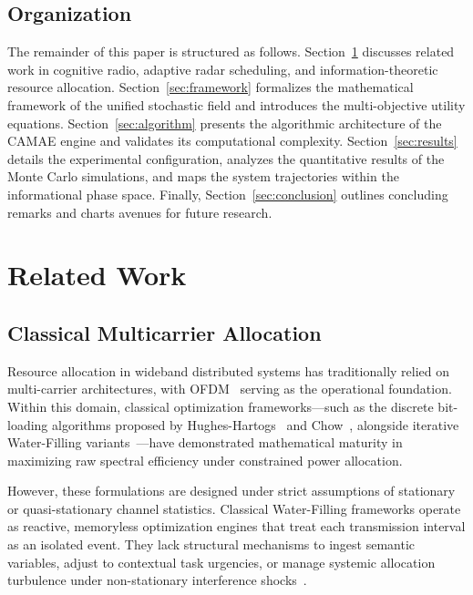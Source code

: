 \documentclass[journal,10pt,twocolumn,twoside]{IEEEtran}
\begin{document}
\subsection{Organization}

The remainder of this paper is structured as follows. Section~\ref{sec:related} discusses related work in cognitive radio, adaptive radar scheduling, and information-theoretic resource allocation. Section~\ref{sec:framework} formalizes the mathematical framework of the unified stochastic field and introduces the multi-objective utility equations. Section~\ref{sec:algorithm} presents the algorithmic architecture of the CAMAE engine and validates its computational complexity. Section~\ref{sec:results} details the experimental configuration, analyzes the quantitative results of the Monte Carlo simulations, and maps the system trajectories within the informational phase space. Finally, Section~\ref{sec:conclusion} outlines concluding remarks and charts avenues for future research.

\section{Related Work}
\label{sec:related}

\subsection{Classical Multicarrier Allocation}

Resource allocation in wideband distributed systems has traditionally relied on multi-carrier architectures, with OFDM~\cite{weinstein1971data} serving as the operational foundation. Within this domain, classical optimization frameworks---such as the discrete bit-loading algorithms proposed by Hughes-Hartogs~\cite{hughes1993ensemble} and Chow~\cite{chow1995practical}, alongside iterative Water-Filling variants~\cite{yu2002water}---have demonstrated mathematical maturity in maximizing raw spectral efficiency under constrained power allocation.

However, these formulations are designed under strict assumptions of stationary or quasi-stationary channel statistics. Classical Water-Filling frameworks operate as reactive, memoryless optimization engines that treat each transmission interval as an isolated event. They lack structural mechanisms to ingest semantic variables, adjust to contextual task urgencies, or manage systemic allocation turbulence under non-stationary interference shocks~\cite{goldsmith1997variable}.
\end{document}
